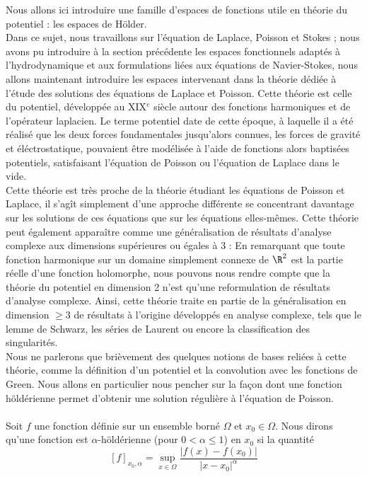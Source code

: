 Nous allons ici introduire une famille d'espaces de fonctions utile en théorie du potentiel : les espaces de Hölder. \\
Dans ce sujet, nous travaillons sur l'équation de Laplace, Poisson et Stokes ; nous avons pu introduire à la section précédente les espaces fonctionnels adaptés à l'hydrodynamique et aux formulations liées aux équations de Navier-Stokes, 
nous allons maintenant introduire les espaces intervenant dans la théorie dédiée à l'étude des solutions des équations de Laplace et Poisson. Cette théorie est celle du potentiel, développée au XIX$^e$ siècle autour des fonctions harmoniques et de l'opérateur laplacien. 
Le terme potentiel date de cette époque, à laquelle il a été réalisé que les deux forces fondamentales jusqu'alors connues, les forces de gravité et éléctrostatique, pouvaient être modélisée à l'aide de fonctions alors baptisées potentiels, satisfaisant l'équation de Poisson ou l'équation de Laplace dans le vide.\\
Cette théorie est très proche de la théorie étudiant les équations de Poisson et Laplace, il s'agît simplement d'une approche différente se concentrant davantage sur les solutions de ces équations que sur les équations elles-mêmes. Cette théorie peut également apparaître comme une généralisation de résultats d'analyse complexe aux dimensions supérieures ou égales à 3 :
En remarquant que toute fonction harmonique sur un domaine simplement connexe de $\R^2$ est la partie réelle d'une fonction holomorphe, nous pouvons nous rendre compte que la théorie du potentiel en dimension 2 n'est qu'une reformulation de résultats d'analyse complexe. Ainsi, cette théorie traite en partie de la généralisation en dimension $\geq 3$ de résultats à l'origine développés en analyse complexe, tels que le lemme de Schwarz, les séries de Laurent ou encore la classification des singularités.\\
Nous ne parlerons que brièvement des quelques notions de bases reliées à cette théorie, comme la définition d'un potentiel et la convolution avec les fonctions de Green. Nous allons en particulier nous pencher sur la façon dont une fonction höldérienne permet d'obtenir une solution régulière à l'équation de Poisson.\\
\\
Soit $f$ une fonction définie sur un ensemble borné $\Omega$ et $x_0 \in \Omega$.
Nous dirons qu'une fonction est $\alpha$-höldérienne (pour $0 < \alpha \leq 1$) en $x_0$ si la quantité 
$$ [f]_{x_0,\alpha} = \underset{x \in \Omega}{\sup} \frac{|f(x) - f(x_0)|}{|x-x_0|^{\alpha}} $$
